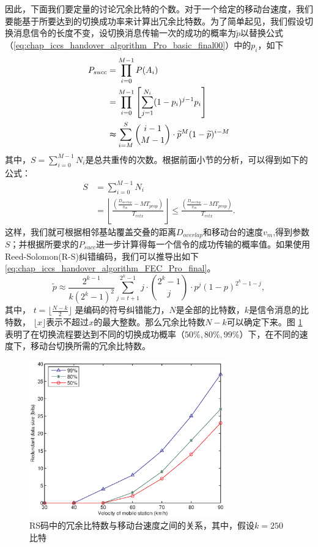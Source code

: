 因此，下面我们要定量的讨论冗余比特的个数。对于一个给定的移动台速度，我们要能基于所要达到的切换成功率来计算出冗余比特数。为了简单起见，我们假设切换消息信令的长度不变，设切换消息传输一次的成功的概率为$\tilde{p}$以替换公式（\ref{eq:chap_iccs_handover_algorithm_Pro_basic_final00}）中的$p_i$，如下
\begin{align}
\notag P_{succ} &= \prod_{i=0}^{M-1}P(A_{i})\\
&= \prod_{i=0}^{M-1}\left[\sum_{j=1}^{N_{i}}(1-p_{i})^{j-1}p_{i}\right]\\
\notag &\thickapprox\sum_{i=M}^{S}{i-1 \choose M-1}\cdot\widetilde{p}^{M}(1-\widetilde{p})^{i-M}
\end{align}
其中，$S=\sum_{i=0}^{M-1}N_{i}$是总共重传的次数。根据前面小节的分析，可以得到如下的公式：
\begin{align*}
S & = \sum_{i=0}^{M-1}N_{i}\\
  & = \left\lfloor \frac{(\frac{D_{overlap}}{v_{m}}-MT_{prop})}
        {T_{retx}}\right\rfloor \leq\frac{(\frac{D_{overlap}}{v_{m}}
        -MT_{prop})}{T_{retx}}.
\end{align*}
这样，我们就可根据相邻基站覆盖交叠的距离$D_{overlap}$和移动台的速度$v_m$,得到参数$S$；并根据所要求的$P_{succ}$进一步计算得每一个信令的成功传输的概率值。如果使用Reed-Solomon(R-S)纠错编码，我们可以推导出如下\eqref{eq:chap_iccs_handover_algorithm_FEC_Pro_final}。
\begin{equation}\label{eq:chap_iccs_handover_algorithm_FEC_Pro_final}
\tilde{p}\approx\frac{2^{k-1}}{k(2^{k}-1)^{2}}\sum_{j=t+1}^{2^{k}-1}j
\cdot{2^{k}-1\choose j}_{}^{}\cdot p^{j}(1-p)^{2^{k}-1-j},
\end{equation}
其中， $t=\lfloor\frac{N-k}{2}\rfloor$ 是编码的符号纠错能力，$N$是全部的比特数，$k$是信令消息的比特数， $\lfloor{x}\rfloor$表示不超过$x$的最大整数。那么冗余比特数$N-k$可以确定下来。图 \ref{fig:chap_iccs_handover_algorithm_AFEC_bits} 表明了在切换流程要达到不同的切换成功概率（$50\%,80\%,99\%$）下，在不同的速度下，移动台切换所需的冗余比特数。
\begin{figure}[t]
\begin{centering}
\includegraphics[height=6.75cm]{iccs_speed_size_theory}
\caption{RS码中的冗余比特数与移动台速度之间的关系，其中，假设$k=250$比特}
\label{fig:chap_iccs_handover_algorithm_AFEC_bits}
\end{centering}
\end{figure}
